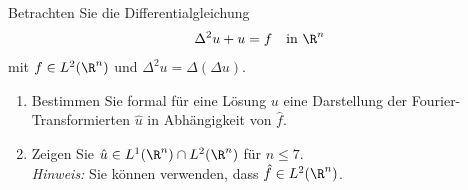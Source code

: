 
\begin{exercise}

Betrachten Sie die Differentialgleichung
\begin{align*}
  \Delta^2 u +  u = f \quad \text{in } \R^n
\end{align*}
mit $f \in L^2(\R^n)$ und $\Delta^2 u = \Delta(\Delta u)$.
\begin{enumerate}[label = (\roman*)]
  \item Bestimmen Sie formal für eine Lösung $u$ eine Darstellung der
  Fourier-Transformierten $\hat{u}$ in Abhängigkeit von $\hat{f}$.
  \item Zeigen Sie $\hat{u} \in L^1(\R^n) \cap L^2(\R^n)$ für $n \leq 7$. \\
  \textit{Hinweis:} Sie können verwenden, dass $\hat{f} \in L^2(\R^n)$.
\end{enumerate}

\end{exercise}


\begin{solution}

\phantom{}

\end{solution}

